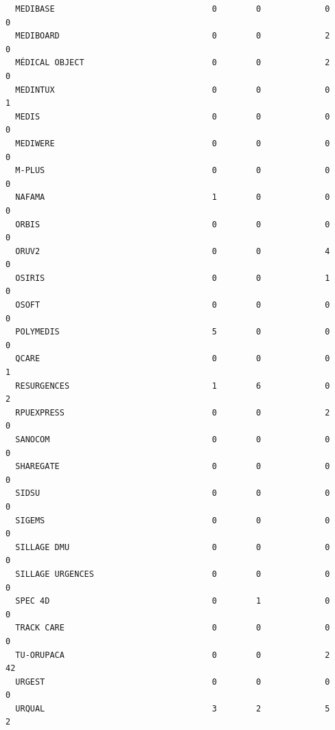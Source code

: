 \documentclass[]{article}
\begin{document}
\begin{verbatim}
  MEDIBASE                                0        0             0    0
  MEDIBOARD                               0        0             2    0
  MÉDICAL OBJECT                          0        0             2    0
  MEDINTUX                                0        0             0    1
  MEDIS                                   0        0             0    0
  MEDIWERE                                0        0             0    0
  M-PLUS                                  0        0             0    0
  NAFAMA                                  1        0             0    0
  ORBIS                                   0        0             0    0
  ORUV2                                   0        0             4    0
  OSIRIS                                  0        0             1    0
  OSOFT                                   0        0             0    0
  POLYMEDIS                               5        0             0    0
  QCARE                                   0        0             0    1
  RESURGENCES                             1        6             0    2
  RPUEXPRESS                              0        0             2    0
  SANOCOM                                 0        0             0    0
  SHAREGATE                               0        0             0    0
  SIDSU                                   0        0             0    0
  SIGEMS                                  0        0             0    0
  SILLAGE DMU                             0        0             0    0
  SILLAGE URGENCES                        0        0             0    0
  SPEC 4D                                 0        1             0    0
  TRACK CARE                              0        0             0    0
  TU-ORUPACA                              0        0             2   42
  URGEST                                  0        0             0    0
  URQUAL                                  3        2             5    2
                        

\end{verbatim}
\end{document}
